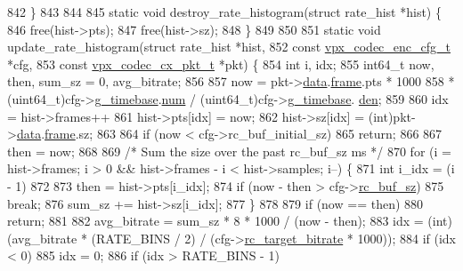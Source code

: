 \begin{DoxyCodeInclude}
{{{{{{{{{{{{{{{{{{{{{{{{{{842 \}
843 
844 
845 \textcolor{keyword}{static} \textcolor{keywordtype}{void} destroy\_rate\_histogram(\textcolor{keyword}{struct} rate\_hist *hist) \{
846   free(hist->pts);
847   free(hist->sz);
848 \}
849 
850 
851 \textcolor{keyword}{static} \textcolor{keywordtype}{void} update\_rate\_histogram(\textcolor{keyword}{struct} rate\_hist          *hist,
852                                   \textcolor{keyword}{const} \hyperlink{structvpx__codec__enc__cfg}{vpx\_codec\_enc\_cfg\_t} *cfg,
853                                   \textcolor{keyword}{const} \hyperlink{structvpx__codec__cx__pkt}{vpx\_codec\_cx\_pkt\_t}  *pkt) \{
854   \textcolor{keywordtype}{int} i, idx;
855   int64\_t now, then, sum\_sz = 0, avg\_bitrate;
856 
857   now = pkt->\hyperlink{structvpx__codec__cx__pkt_a7f97b060a23b7e89fe5b885c0074f696}{data}.\hyperlink{structvpx__codec__cx__pkt_a81e33bf4408a3983abb16492fee359ff}{frame}.pts * 1000
858         * (uint64\_t)cfg->\hyperlink{structvpx__codec__enc__cfg_a6498d378e4c29ef3e22258289e481087}{g\_timebase}.\hyperlink{structvpx__rational_ae7774f21a22c9bef3aa73156c79f4731}{num} / (uint64\_t)cfg->\hyperlink{structvpx__codec__enc__cfg_a6498d378e4c29ef3e22258289e481087}{g\_timebase}.
      \hyperlink{structvpx__rational_a29dd2ab4001377b3aa21885ef969759f}{den};
859 
860   idx = hist->frames++ %
861   hist->pts[idx] = now;
862   hist->sz[idx] = (int)pkt->\hyperlink{structvpx__codec__cx__pkt_a7f97b060a23b7e89fe5b885c0074f696}{data}.\hyperlink{structvpx__codec__cx__pkt_a81e33bf4408a3983abb16492fee359ff}{frame}.sz;
863 
864   if (now < cfg->rc\_buf\_initial\_sz)
865     \textcolor{keywordflow}{return};
866 
867   then = now;
868 
869   \textcolor{comment}{/* Sum the size over the past rc\_buf\_sz ms */}
870   \textcolor{keywordflow}{for} (i = hist->frames; i > 0 && hist->frames - i < hist->samples; i--) \{
871     \textcolor{keywordtype}{int} i\_idx = (i - 1) %
872 
873     then = hist->pts[i\_idx];
874     if (now - then > cfg->\hyperlink{structvpx__codec__enc__cfg_a61866272bb588cd86d28834f420430f0}{rc\_buf\_sz})
875       \textcolor{keywordflow}{break};
876     sum\_sz += hist->sz[i\_idx];
877   \}
878 
879   \textcolor{keywordflow}{if} (now == then)
880     \textcolor{keywordflow}{return};
881 
882   avg\_bitrate = sum\_sz * 8 * 1000 / (now - then);
883   idx = (int)(avg\_bitrate * (RATE\_BINS / 2) / (cfg->\hyperlink{structvpx__codec__enc__cfg_ab8339685175d66710f482706cc9f0aed}{rc\_target\_bitrate} * 1000));
884   \textcolor{keywordflow}{if} (idx < 0)
885     idx = 0;
886   \textcolor{keywordflow}{if} (idx > RATE\_BINS - 1)
}}}}}}}}}}}}}}}}}}}}}}}}}}
\end{DoxyCodeInclude}
